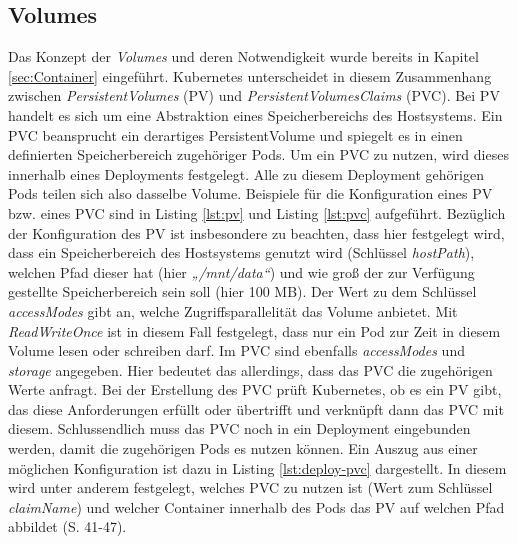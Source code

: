 \documentclass[11pt,a4paper]{article}
\begin{document}
\subsection{Volumes}
Das Konzept der \emph{Volumes} und deren Notwendigkeit wurde bereits in Kapitel \ref{sec:Container} eingeführt.
Kubernetes unterscheidet in diesem Zusammenhang zwischen \emph{PersistentVolumes} (PV) und \emph{PersistentVolumesClaims} (PVC).
Bei PV handelt es sich um eine Abstraktion eines Speicherbereichs des Hostsystems.
Ein PVC beansprucht ein derartiges PersistentVolume und spiegelt es in einen
definierten Speicherbereich zugehöriger Pods. Um ein PVC zu nutzen, wird dieses innerhalb eines Deployments festgelegt.
Alle zu diesem Deployment gehörigen Pods teilen sich also dasselbe Volume.
Beispiele für die Konfiguration eines PV bzw. eines PVC sind in Listing \ref{lst:pv} und Listing \ref{lst:pvc}
aufgeführt. Bezüglich der Konfiguration des PV ist insbesondere zu beachten, dass hier
festgelegt wird, dass ein Speicherbereich des Hostsystems genutzt wird (Schlüssel \emph{hostPath}),
welchen Pfad dieser hat (hier \emph{„/mnt/data“})
und wie groß der zur Verfügung gestellte Speicherbereich sein soll (hier 100 MB).
Der Wert zu dem Schlüssel \emph{accessModes} gibt an, welche Zugriffsparallelität das Volume anbietet.
Mit \emph{ReadWriteOnce} ist in diesem Fall festgelegt, dass nur ein Pod zur Zeit
in diesem Volume lesen oder schreiben darf.
Im PVC sind ebenfalls \emph{accessModes} und \emph{storage} angegeben. Hier
bedeutet das allerdings, dass das PVC die zugehörigen Werte anfragt.
Bei der Erstellung des PVC prüft Kubernetes, ob es ein PV gibt,
das diese Anforderungen erfüllt oder übertrifft und verknüpft dann das PVC mit diesem.
Schlussendlich muss das PVC noch in ein Deployment eingebunden werden, damit die zugehörigen
Pods es nutzen können. Ein Auszug aus einer möglichen Konfiguration ist dazu in
Listing \ref{lst:deploy-pvc} dargestellt. In diesem wird unter anderem festgelegt,
welches PVC zu nutzen ist (Wert zum Schlüssel \emph{claimName}) und welcher Container
innerhalb des Pods das PV auf welchen Pfad abbildet \cite{Schmeling_Dargatz_2022} (S. 41-47).

% 
% 
% 
\end{document}
